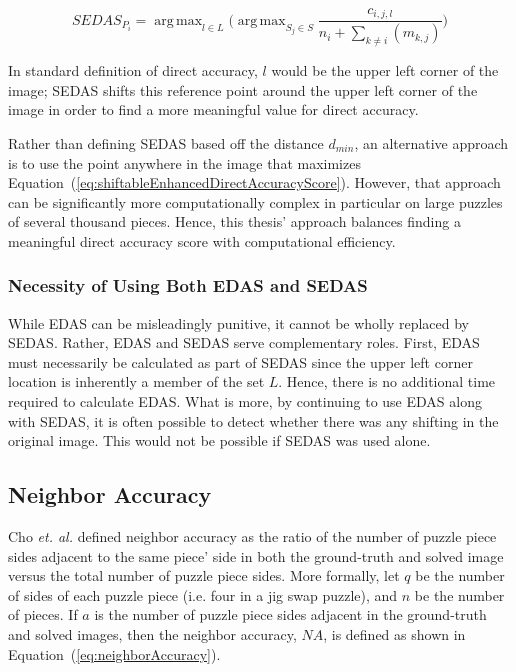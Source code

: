 \documentclass{report}
\def\eref#1{(\ref{#1})}
\DeclareMathOperator*{\argmax}{arg\,max} %
\begin{document}
\begin{equation} \label{eq:shiftableEnhancedDirectAccuracyScore}
SEDAS_{P_i} = \argmax_{l \in L} \Big( \argmax_{S_j \in S}\frac{c_{i,j,l}}{n_i + \sum_{k \ne i}(m_{k,j})} \Big)
\end{equation}

\noindent
In standard definition of direct accuracy, $l$ would be the upper left corner of the image; SEDAS shifts this reference point around the upper left corner of the image in order to find a more meaningful value for direct accuracy. 

Rather than defining SEDAS based off the distance $d_{min}$, an alternative approach is to use the point anywhere in the image that maximizes Equation~\eref{eq:shiftableEnhancedDirectAccuracyScore}.  However, that approach can be significantly more computationally complex in particular on large puzzles of several thousand pieces.  Hence, this thesis' approach balances finding a meaningful direct accuracy score with computational efficiency.

\subsubsection{Necessity of Using Both EDAS and SEDAS}\label{sec:importanceEdasSedas}

While EDAS can be misleadingly punitive, it cannot be wholly replaced by SEDAS.  Rather, EDAS and SEDAS serve complementary roles.  First, EDAS must necessarily be calculated as part of SEDAS since the upper left corner location is inherently a member of the set $L$.  Hence, there is no additional time required to calculate EDAS.  What is more, by continuing to use EDAS along with SEDAS, it is often possible to detect whether there was any shifting in the original image.  This would not be possible if SEDAS was used alone.

\subsection{Neighbor Accuracy}\label{sec:neighborAccuracy}

Cho \textit{et. al.} \cite{cho2010} defined neighbor accuracy as the ratio of the number of puzzle piece sides adjacent to the same piece' side in both the ground-truth and solved image versus the total number of puzzle piece sides.  More formally, let $q$ be the number of sides of each puzzle piece (i.e. four in a jig swap puzzle), and $n$ be the number of pieces.  If $a$ is the number of puzzle piece sides adjacent in the ground-truth and solved images, then the neighbor accuracy, $NA$, is defined as shown in Equation~\eref{eq:neighborAccuracy}.
\end{document}
